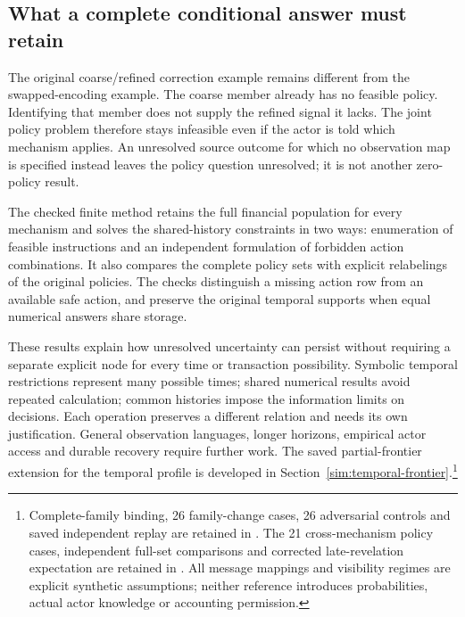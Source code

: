 \pagebreak
\subsection{What a complete conditional answer must retain}

The original coarse/refined correction example remains different from the swapped-encoding example. The coarse member already has no feasible policy. Identifying that member does not supply the refined signal it lacks. The joint policy problem therefore stays infeasible even if the actor is told which mechanism applies. An unresolved source outcome for which no observation map is specified instead leaves the policy question unresolved; it is not another zero-policy result.

The checked finite method retains the full financial population for every mechanism and solves the shared-history constraints in two ways: enumeration of feasible instructions and an independent formulation of forbidden action combinations. It also compares the complete policy sets with explicit relabelings of the original policies. The checks distinguish a missing action row from an available safe action, and preserve the original temporal supports when equal numerical answers share storage.

These results explain how unresolved uncertainty can persist without requiring a separate explicit node for every time or transaction possibility. Symbolic temporal restrictions represent many possible times; shared numerical results avoid repeated calculation; common histories impose the information limits on decisions. Each operation preserves a different relation and needs its own justification. General observation languages, longer horizons, empirical actor access and durable recovery require further work. The saved partial-frontier extension for the temporal profile is developed in Section~\ref{sim:temporal-frontier}.\footnote{Complete-family binding, 26 family-change cases, 26 adversarial controls and saved independent replay are retained in . The 21 cross-mechanism policy cases, independent full-set comparisons and corrected late-revelation expectation are retained in . All message mappings and visibility regimes are explicit synthetic assumptions; neither reference introduces probabilities, actual actor knowledge or accounting permission.}
